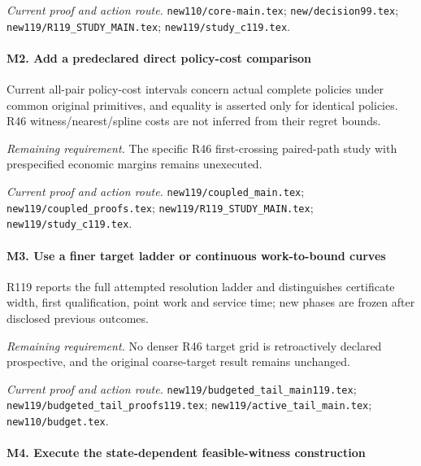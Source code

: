 \par\emph{Current proof and action route.} \nolinkurl{new110/core-main.tex}; \nolinkurl{new/decision99.tex}; \nolinkurl{new119/R119_STUDY_MAIN.tex}; \nolinkurl{new119/study_c119.tex}.

\paragraph{M2. Add a predeclared direct policy-cost comparison}

Current all-pair policy-cost intervals concern actual complete policies under common original primitives, and equality is asserted only for identical policies. R46 witness/\allowbreak{}nearest/\allowbreak{}spline costs are not inferred from their regret bounds.

\par\emph{Remaining requirement.} The specific R46 first-crossing paired-path study with prespecified economic margins remains unexecuted.

\par\emph{Current proof and action route.} \nolinkurl{new119/coupled_main.tex}; \nolinkurl{new119/coupled_proofs.tex}; \nolinkurl{new119/R119_STUDY_MAIN.tex}; \nolinkurl{new119/study_c119.tex}.

\paragraph{M3. Use a finer target ladder or continuous work-to-bound curves}

R119 reports the full attempted resolution ladder and distinguishes certificate width, first qualification, point work and service time; new phases are frozen after disclosed previous outcomes.

\par\emph{Remaining requirement.} No denser R46 target grid is retroactively declared prospective, and the original coarse-target result remains unchanged.

\par\emph{Current proof and action route.} \nolinkurl{new119/budgeted_tail_main119.tex}; \nolinkurl{new119/budgeted_tail_proofs119.tex}; \nolinkurl{new119/active_tail_main.tex}; \nolinkurl{new110/budget.tex}.

\paragraph{M4. Execute the state-dependent feasible-witness construction}

